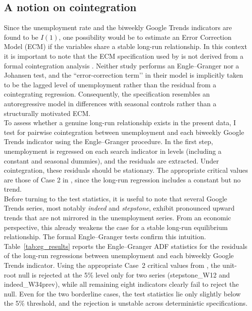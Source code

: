\documentclass[12pt,a4paper]{article}
\begin{document}
\subsection{A notion on cointegration}
Since the unemployment rate and the biweekly Google Trends indicators are found to be 
$I(1)$, one possibility would be to estimate an Error Correction Model (ECM) if the 
variables share a stable long-run relationship. In this context it is important to 
note that the ECM specification used by \citet{Askitas} 
is not derived from a formal cointegration analysis \citep{engle}. Neither study performs an 
Engle–Granger nor a Johansen test, and the “error-correction term’’ in their model is 
implicitly taken to be the lagged level of unemployment rather than the residual from 
a cointegrating regression. Consequently, the specification resembles an autoregressive 
model in differences with seasonal controls rather than a structurally motivated ECM.\\
To assess whether a genuine long-run relationship exists in the present data, I test 
for pairwise cointegration between unemployment and each biweekly Google Trends 
indicator using the Engle–Granger procedure. In the first step, unemployment is 
regressed on each search indicator in levels (including a constant and seasonal 
dummies), and the residuals are extracted. Under cointegration, these residuals should 
be stationary. The appropriate critical values are those of Case 2 in 
\citet{hamilton}, since the long-run regression includes a constant but no trend.\\
Before turning to the test statistics, it is useful to note that several Google Trends 
series, most notably \emph{indeed} and \emph{stepstone}, exhibit pronounced upward 
trends that are not mirrored in the unemployment series. From an economic 
perspective, this already weakens the case for a stable long-run equilibrium 
relationship. The formal Engle–Granger tests confirm this intuition. 
Table~\ref{tab:eg_results} reports the Engle--Granger ADF statistics for the 
residuals of the long-run regressions between unemployment and each biweekly Google 
Trends indicator. Using the appropriate Case~2 critical values from 
\citet{hamilton}, the unit-root null is rejected at the 5\% level only for two 
series (stepstone\_W12 and indeed\_W34prev), while all remaining eight indicators 
clearly fail to reject the null. Even for the two borderline cases, the test 
statistics lie only slightly below the 5\% threshold, and the rejection is unstable 
across deterministic specifications. \\
\end{document}
